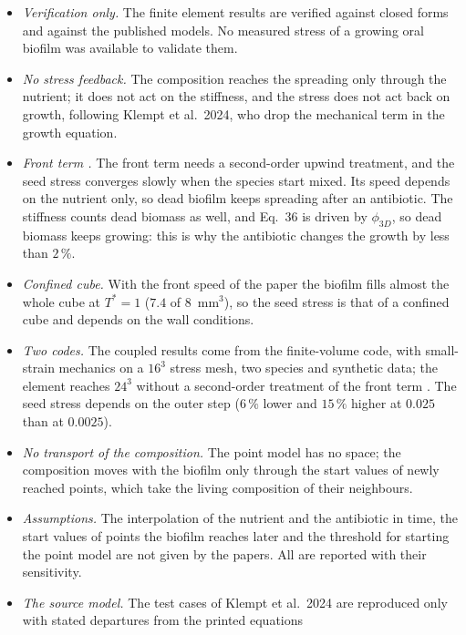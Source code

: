 \begin{itemize}
  \item \emph{Verification only.} The finite element results are
        verified against closed forms and against the published models. No
        measured stress of a growing oral biofilm was available to validate
        them.
  \item \emph{No stress feedback.} The composition reaches the spreading only
        through the nutrient; it does not act on the stiffness, and the stress
        does not act back on growth, following Klempt et al.\ 2024, who drop the
        mechanical term in the growth equation.
  \item \emph{Front term \fterm{}.} The front term \fterm{} needs a second-order upwind
        treatment, and the seed stress converges slowly when the species start
        mixed. Its speed depends on the nutrient only, so dead biofilm keeps
        spreading after an antibiotic. The stiffness counts dead biomass as well, and Eq.~36 is driven by
        $\phi_{3D}$, so dead biomass keeps growing: this is why the antibiotic changes the growth by less than $2\,\%$.
  \item \emph{Confined cube.} With the front speed of the paper the biofilm fills almost the whole cube at
        $T^*=1$ ($7.4$ of $8$~mm$^3$), so the seed stress is that of a confined cube and depends on the wall conditions.
  \item \emph{Two codes.} The coupled results come from the finite-volume code, with small-strain mechanics on a
        $16^3$ stress mesh, two species and synthetic data; the element reaches $24^3$ without a second-order
        treatment of the front term \fterm{}. The seed stress depends on the outer step ($6\,\%$ lower and $15\,\%$
        higher at $0.025$ than at $0.0025$).
  \item \emph{No transport of the composition.} The point model has no space; the
        composition moves with the biofilm only through the start values of newly
        reached points, which take the living composition of their neighbours.
  \item \emph{Assumptions.} The interpolation of the nutrient and the antibiotic
        in time, the start values of points the biofilm reaches later and the
        threshold for starting the point model are not given by the papers. All
        are reported with their sensitivity.
  \item \emph{The source model.} The test cases of Klempt et al.\ 2024 are
        reproduced only with stated departures from the printed equations

\end{itemize}
